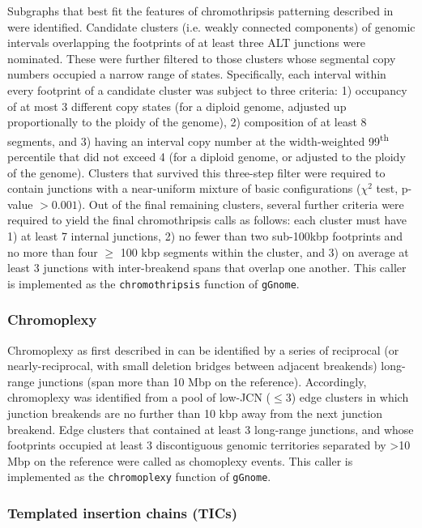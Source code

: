 \documentclass[phd,tocprelim]{cornell}
\newcommand{\ttt}[1]{\texttt{#1}}
\begin{document}
Subgraphs that best fit the features of chromothripsis patterning described in \cite{korbel2013} were identified. Candidate clusters (i.e. weakly connected components) of genomic intervals overlapping the footprints of at least three ALT junctions were nominated.  These were further filtered to those clusters whose segmental copy numbers occupied a narrow range of states. Specifically, each interval within every footprint of a candidate cluster was subject to three criteria: 1) occupancy of at most 3 different copy states (for a diploid genome, adjusted up proportionally to the ploidy of the genome), 2) composition of at least 8 segments, and 3) having an interval copy number at the width-weighted 99\textsuperscript{th} percentile that did not exceed 4 (for a diploid genome, or adjusted to the ploidy of the genome). Clusters that survived this three-step filter were required to contain junctions with a near-uniform mixture of basic configurations ($\chi^2$ test, p-value $> 0.001$). Out of the final remaining clusters, several further criteria were required to yield the final chromothripsis calls as follows: each cluster must have 1) at least 7 internal junctions, 2) no fewer than two sub-100kbp footprints and no more than four $\geq$ 100 kbp segments within the cluster, and 3) on average at least 3 junctions with inter-breakend spans that overlap one another. This caller is implemented as the \ttt{chromothripsis} function of \ttt{gGnome}.

\subsubsection*{Chromoplexy}

Chromoplexy as first described in \cite{baca2013} can be identified by a series of reciprocal (or nearly-reciprocal, with small deletion bridges between adjacent breakends) long-range junctions (span more than 10 Mbp on the reference). Accordingly, chromoplexy was identified from a pool of low-JCN ($\leq 3$) edge clusters in which junction breakends are no further than 10 kbp away from the next junction breakend. Edge clusters that contained at least 3 long-range junctions, and whose footprints occupied at least 3 discontiguous genomic territories separated by >10 Mbp on the reference were called as chomoplexy events. This caller is implemented as the \ttt{chromoplexy} function of \ttt{gGnome}.

\subsubsection*{Templated insertion chains (TICs)}
\end{document}
